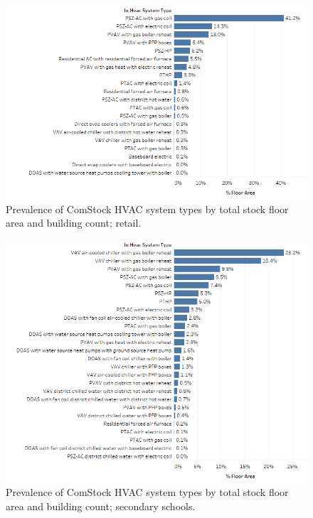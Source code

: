 \begin{figure}
    \centering \includegraphics[width=1.0\textwidth]{figures/HVAC_SYS_Type_PREV_Retail.png}
    \caption[HVAC system type prevalence in retail]{Prevalence of ComStock HVAC system types by total stock floor area and building count; retail.}
    \label{fig:hvac_sys_type_prevalence_retail}
\end{figure}

\begin{figure}
    \centering \includegraphics[width=1.0\textwidth]{figures/HVAC_SYS_Type_PREV_Secondary_School.png}
    \caption[HVAC system type prevalence in secondary schools]{Prevalence of ComStock HVAC system types by total stock floor area and building count; secondary schools.}
    \label{fig:hvac_sys_type_prevalence_secondary_school}
\end{figure}

